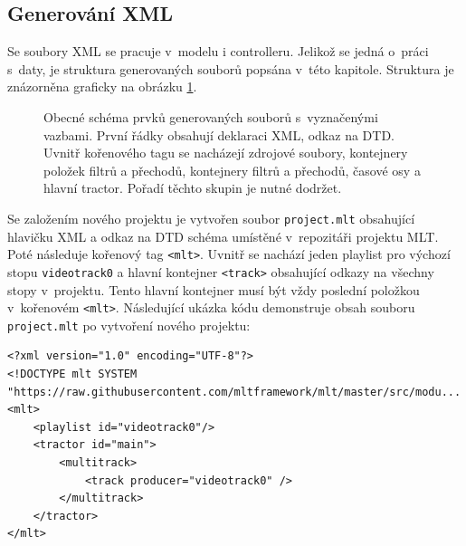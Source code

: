 \subsection{Generování XML}
Se soubory XML se pracuje v~modelu i controlleru. Jelikož se jedná o~práci s~daty, je struktura generovaných souborů popsána v~této kapitole. Struktura je znázorněna graficky na obrázku \ref{img:schemaXML}.
\begin{figure}[h]
	\centering
	\caption{Obecné schéma prvků generovaných souborů s~vyznačenými vazbami. První řádky obsahují deklaraci XML, odkaz na DTD. Uvnitř kořenového tagu se nacházejí zdrojové soubory, kontejnery položek filtrů a přechodů, kontejnery filtrů a přechodů, časové osy a hlavní tractor. Pořadí těchto skupin je nutné dodržet.}\label{img:schemaXML}
\end{figure}

Se založením nového projektu je vytvořen soubor \texttt{project.mlt} obsahující hlavičku XML a odkaz na DTD schéma umístěné v~repozitáři projektu MLT. Poté následuje kořenový tag \texttt{<mlt>}. Uvnitř se nachází jeden playlist pro výchozí stopu \texttt{videotrack0} a hlavní kontejner \texttt{<track>} obsahující odkazy na všechny stopy v~projektu. Tento hlavní kontejner musí být vždy poslední položkou v~kořenovém \texttt{<mlt>}. Následující ukázka kódu demonstruje obsah souboru \texttt{project.mlt} po vytvoření nového projektu:
\begin{lstlisting}[style=xml]
<?xml version="1.0" encoding="UTF-8"?>
<!DOCTYPE mlt SYSTEM "https://raw.githubusercontent.com/mltframework/mlt/master/src/modu...
<mlt>
    <playlist id="videotrack0"/>
    <tractor id="main">
        <multitrack>
            <track producer="videotrack0" />
        </multitrack>
    </tractor>
</mlt>
\end{lstlisting}

